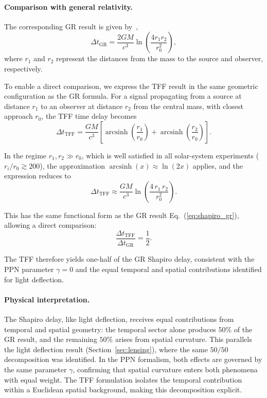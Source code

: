 \documentclass[12pt]{article}
\begin{document}
\paragraph{Comparison with general relativity.}
The corresponding GR result is given by~\cite{Shapiro1964},~\cite{Bertotti2003}
\begin{equation}
\Delta t_{\text{GR}} = \frac{2GM}{c^3}\ln\left(\frac{4r_1 r_2}{r_0^2}\right) ,
\label{eq:shapiro_gr}
\end{equation}
where $r_1$ and $r_2$ represent the distances from the mass to the source and observer, respectively.

To enable a direct comparison, we express the TFF result in the same geometric configuration as the GR formula. For a signal propagating from a source at distance $r_1$ to an observer at distance $r_2$ from the central mass, with closest approach $r_0$, the TFF time delay becomes
$$
\Delta t_{\text{TFF}}
= \frac{GM}{c^3}\left[
  \operatorname{arcsinh}\!\left(\frac{r_1}{r_0}\right)
+ \operatorname{arcsinh}\!\left(\frac{r_2}{r_0}\right)
\right] .
$$

In the regime $r_1, r_2 \gg r_0$, which is well satisfied in all solar-system experiments ($r_i/r_0 \gtrsim 200$), the approximation $\operatorname{arcsinh}(x) \approx \ln(2x)$ applies, and the expression reduces to
$$
\Delta t_{\text{TFF}}
\approx \frac{GM}{c^3}\ln\!\left(\frac{4\,r_1\,r_2}{r_0^2}\right) .
\label{eq:shapiro_tff_log}
$$

This has the same functional form as the GR result Eq.~(\ref{eq:shapiro_gr}), allowing a direct comparison:
\begin{equation}
\frac{\Delta t_{\text{TFF}}}{\Delta t_{\text{GR}}}
= \frac{1}{2} .
\end{equation}

The TFF therefore yields one-half of the GR Shapiro delay, consistent with the PPN parameter $\gamma = 0$ and the equal temporal and spatial contributions identified for light deflection.

\paragraph{Physical interpretation.}
The Shapiro delay, like light deflection, receives equal contributions from temporal and spatial geometry: the temporal sector alone produces $50\%$ of the GR result, and the remaining $50\%$ arises from spatial curvature. This parallels the light deflection result (Section~\ref{sec:lensing}), where the same $50/50$ decomposition was identified. In the PPN formalism, both effects are governed by the same parameter $\gamma$, confirming that spatial curvature enters both phenomena with equal weight. The TFF formulation isolates the temporal contribution within a Euclidean spatial background, making this decomposition explicit.
\end{document}
